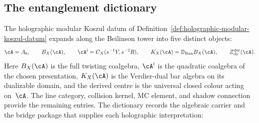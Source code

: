 %
%

\subsection{The entanglement dictionary}
\label{subsec:thqg-entanglement-dictionary}

The holographic modular Koszul datum of
Definition~\ref{def:holographic-modular-koszul-datum} expands along
the Beilinson tower into five distinct objects:
\[
 \cA=A_b,\qquad B_X(\cA),\qquad
 \cA^{\mathrm i}=C_X(s^{-1}V,s^{-2}R),\qquad
 K_X(\cA)=\mathbb D_{\operatorname{Ran}}B_X(\cA),\qquad
 Z^{\mathrm{der}}_{\mathrm{ch}}(\cA).
\]
Here $B_X(\cA)$ is the full twisting coalgebra,
$\cA^{\mathrm i}$ is the quadratic coalgebra of the chosen
presentation, $K_X(\cA)$ is the Verdier-dual bar algebra on its
dualizable domain, and the derived centre is the universal closed
colour acting on~$\cA$.  The line category, collision kernel, MC
element, and shadow connection provide the remaining entries.  The
dictionary records the algebraic carrier and the bridge package that
supplies each holographic interpretation:

